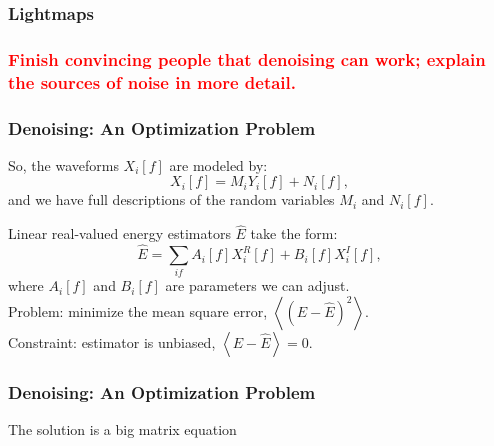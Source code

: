 \documentclass{beamer}
\begin{document}
\begin{frame}
\begin{center}
\frametitle{Lightmaps}
\end{center}
\end{frame}



\begin{frame}
\begin{center}
\frametitle{\textcolor{red}{Finish convincing people that denoising can work; explain the sources of noise in more detail.}}
\end{center}
\end{frame}


\begin{frame}
\begin{center}
\frametitle{Denoising: An Optimization Problem}
\end{center}
So, the waveforms $X_i[f]$ are modeled by:
\[X_i[f] = M_i Y_i[f] + N_i[f],\]
and we have full descriptions of the random variables $M_i$ and $N_i[f]$.

Linear real-valued energy estimators $\widehat{E}$ take the form:
\[\widehat{E} = \sum_{if} A_i[f] X^R_i[f] + B_i[f] X^I_i[f],\]
where $A_i[f]$ and $B_i[f]$ are parameters we can adjust.\\[0.5\baselineskip]

Problem: minimize the mean square error, $\left<\left(E-\widehat{E}\right)^2\right>$.\\[0.5\baselineskip]
Constraint:  estimator is unbiased, $\left<E-\widehat{E}\right>=0$.
\end{frame}

\begin{frame}
\begin{center}
\frametitle{Denoising: An Optimization Problem}
\end{center}
The solution is a big matrix equation
\end{frame}
\end{document}
